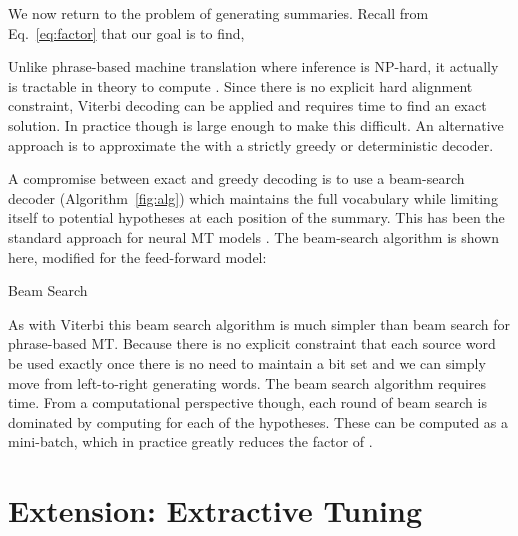 \documentclass[11pt,a4paper]{article}
\begin{document}
We now return to the problem of generating summaries. Recall from Eq.~\ref{eq:factor} that our goal is to find,  


\noindent Unlike phrase-based machine translation where inference is
NP-hard, it actually is tractable in theory to compute .
Since there is no explicit hard alignment constraint, Viterbi decoding
can be applied and requires  time to find an exact
solution. In practice though  is large enough to make this
difficult. An alternative approach is to approximate the  with a strictly
greedy or deterministic decoder. 

A compromise between exact and greedy decoding is to use a beam-search
decoder (Algorithm~\ref{fig:alg}) which maintains the full vocabulary  while limiting itself
to  potential hypotheses at each position of the summary. This has been the standard
approach for neural MT models \cite{bahdanau2014neural,sutskever2014sequence,luong2014addressing}. The beam-search algorithm is shown here, modified for the feed-forward model:

\begin{algorithm}[ht]
  \small
  \begin{algorithmic}
    \State{}
    \State{}

    \State{
      }    
    \State{ }
    \State{}
    \EndFor
    \State{\Return{ }}
  \end{algorithmic}
  \caption{\label{fig:alg} Beam Search }
\end{algorithm}

As with Viterbi this beam search algorithm is much simpler than beam
search for phrase-based MT. Because there is no explicit constraint
that each source word be used exactly once there is no need to
maintain a bit set and we can simply move from left-to-right generating
words. The beam search algorithm requires  time. From a
computational perspective though, each round of beam search is
dominated by computing  for each of the
 hypotheses. These can be computed as a mini-batch, which 
in practice greatly reduces the factor of .


\section{Extension: Extractive Tuning}
\label{sec:tuning}
\end{document}
